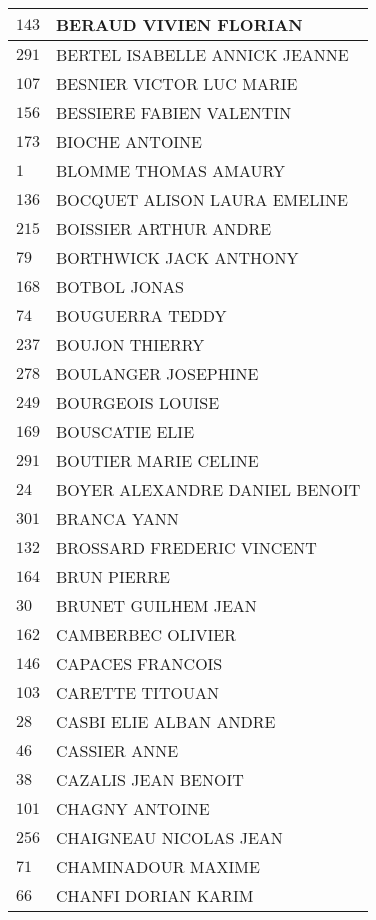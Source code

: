\begin{xltabular}{\linewidth}{|l|X|}
    \hline
    $143$ & BERAUD VIVIEN FLORIAN \\
    \hline
    $291$ & BERTEL ISABELLE ANNICK JEANNE \\
    \hline
    $107$ & BESNIER VICTOR LUC MARIE \\
    \hline
    $156$ & BESSIERE FABIEN VALENTIN \\
    \hline
    $173$ & BIOCHE ANTOINE \\
    \hline
    $1$ & BLOMME THOMAS AMAURY \\
    \hline
    $136$ & BOCQUET ALISON LAURA EMELINE \\
    \hline
    $215$ & BOISSIER ARTHUR ANDRE \\
    \hline
    $79$ & BORTHWICK JACK ANTHONY \\
    \hline
    $168$ & BOTBOL JONAS \\
    \hline
    $74$ & BOUGUERRA TEDDY \\
    \hline
    $237$ & BOUJON THIERRY \\
    \hline
    $278$ & BOULANGER JOSEPHINE \\
    \hline
    $249$ & BOURGEOIS LOUISE \\
    \hline
    $169$ & BOUSCATIE ELIE \\
    \hline
    $291$ & BOUTIER MARIE CELINE \\
    \hline
    $24$ & BOYER ALEXANDRE DANIEL BENOIT \\
    \hline
    $301$ & BRANCA YANN \\
    \hline
    $132$ & BROSSARD FREDERIC VINCENT \\
    \hline
    $164$ & BRUN PIERRE \\
    \hline
    $30$ & BRUNET GUILHEM JEAN \\
    \hline
    $162$ & CAMBERBEC OLIVIER \\
    \hline
    $146$ & CAPACES FRANCOIS \\
    \hline
    $103$ & CARETTE TITOUAN \\
    \hline
    $28$ & CASBI ELIE ALBAN ANDRE \\
    \hline
    $46$ & CASSIER ANNE \\
    \hline
    $38$ & CAZALIS JEAN BENOIT \\
    \hline
    $101$ & CHAGNY ANTOINE \\
    \hline
    $256$ & CHAIGNEAU NICOLAS JEAN \\
    \hline
    $71$ & CHAMINADOUR MAXIME \\
    \hline
    $66$ & CHANFI DORIAN KARIM \\

\end{xltabular}
